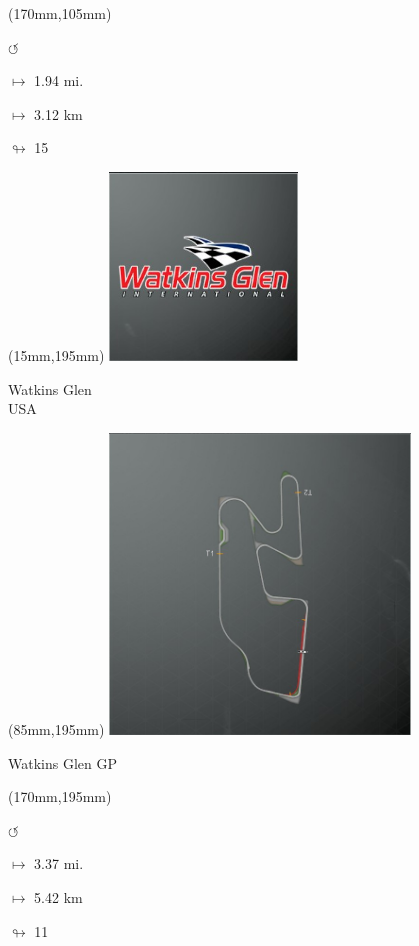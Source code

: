 \begin{textblock*}{30mm}(170mm,105mm)%
\par \Huge$\circlearrowleft$
\Large
\par$\mapsto$ 1.94 mi.
\par$\mapsto$ 3.12 km
\par$\looparrowright$ 15
\end{textblock*}
\begin{textblock*}{60mm}(15mm,195mm)%
\includegraphics[width=50mm]{LG/2015-05-20_00097.png}
\par Watkins Glen\\ USA
\end{textblock*}
\begin{textblock*}{80mm}(85mm,195mm)%
\includegraphics[width=80mm]{TR/2015-05-20_00066.png}
\centerline{Watkins Glen GP}
\end{textblock*}
\begin{textblock*}{30mm}(170mm,195mm)%
\par \Huge$\circlearrowleft$
\Large
\par$\mapsto$ 3.37 mi.
\par$\mapsto$ 5.42 km
\par$\looparrowright$ 11
\end{textblock*}
\null\newpage

